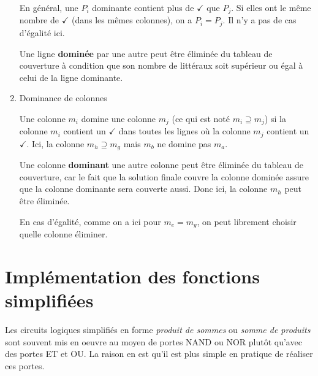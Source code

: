 \documentclass[letter, oneside]{book}
\begin{document}
\begin{enumerate}
En général, une \(P_i\) dominante contient plus de \(\checkmark\) que \(P_j\). Si
elles ont le même nombre de \(\checkmark\) (dans les mêmes colonnes), on a \(P_i =
P_j\). Il n'y a pas de cas d'égalité ici.

Une ligne \textbf{dominée} par une autre peut être éliminée du tableau de
couverture à condition que son nombre de littéraux soit supérieur ou
égal à celui de la ligne dominante.

\item Dominance de colonnes
\label{sec:org85a0173}

Une colonne \(m_i\) domine une colonne \(m_j\) (ce qui est noté \(m_i \supseteq
m_j\)) si la colonne \(m_i\) contient un \(\checkmark\) dans toutes les lignes où
la colonne \(m_j\) contient un \(\checkmark\). Ici, la colonne \(m_h \supseteq
m_g\) mais \(m_b\) ne domine pas \(m_a\). 

Une colonne \textbf{dominant} une autre colonne peut être éliminée du tableau de
couverture, car le fait que la solution finale couvre la colonne
dominée assure que la colonne dominante sera couverte aussi. Donc ici,
la colonne \(m_h\) peut être éliminée.

En cas d'égalité, comme on a ici pour \(m_e = m_g\), on peut librement
choisir quelle colonne éliminer.
\end{enumerate}

\section{Implémentation des fonctions simplifiées}
\label{sec:orgbbc473d}

Les circuits logiques simplifiés en forme \emph{produit de sommes} ou
\emph{somme de produits} sont souvent mis en oeuvre au moyen de portes NAND
ou NOR plutôt qu'avec des portes ET et OU. La raison en est qu'il est
plus simple en pratique de réaliser ces portes.
\end{document}
